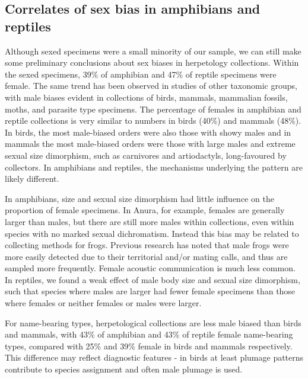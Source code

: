 \documentclass[a4paper, 12pt]{article}
\begin{document}
\subsection{Correlates of sex bias in amphibians and reptiles}
Although sexed specimens were a small minority of our sample, we can still make some preliminary conclusions about sex biases in herpetology collections. Within the sexed specimens, 39\% of amphibian and 47\% of reptile specimens were female.
The same trend has been observed in studies of other taxonomic groups, with male biases evident in collections of birds\cite{cooper2019sex}, mammals\cite{machin2008,cooper2019sex}, mammalian fossils\cite{gower2019}, moths\cite{plotkin2018large}, and parasite type specimens\cite{poulin2022male}.
The percentage of females in amphibian and reptile collections is very similar to numbers in birds (40\%) and mammals (48\%\cite{cooper2019sex}).
In birds, the most male-biased orders were also those with showy males and in mammals the most male-biased orders were those with large males and extreme sexual size dimorphism, such as carnivores and artiodactyls, long-favoured by collectors.
In amphibians and reptiles, the mechanisms underlying the pattern are likely different.

In amphibians, size and sexual size dimorphism had little influence on the proportion of female specimens.
In Anura, for example, females are generally larger than males, but there are still more males within collections, even within species with no marked sexual dichromatism. Instead this bias may be related to collecting methods for frogs.
Previous research has noted that male frogs were more easily detected due to their territorial and/or mating calls, and thus are sampled more frequently\cite{green2013sex}.
Female acoustic communication is much less common\cite{preininger2016comparison}.
In reptiles, we found a weak effect of male body size and sexual size dimorphism, such that species where males are larger had fewer female specimens than those where females or neither females or males were larger. 

For name-bearing types, herpetological collections are less male biased than birds and mammals, with 43\% of amphibian and 43\% of reptile female name-bearing types, compared with 25\% and 39\% female in birds and mammals respectively\cite{cooper2019sex}.
This difference may reflect diagnostic features - in birds at least plumage patterns contribute to species assignment and often male plumage is used. 
\end{document}
